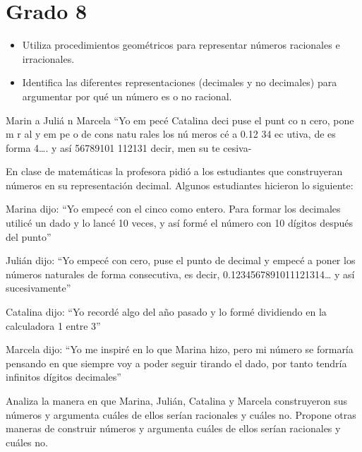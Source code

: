 \section{Grado 8}\label{grado:8}


\evidencias

\begin{itemize}
  \item Utiliza procedimientos geométricos para representar números racionales e irracionales.
  \item Identifica las diferentes representaciones (decimales y no decimales) para argumentar por qué un número es o no racional.
\end{itemize}

\ejemplo

Marin a Juliá n Marcela “Yo em pecé Catalina deci puse el punt co n cero, pone m r al y em pe o de cons natu rales los nú meros cé a 0.12 34 ec utiva, de es forma 4…. y así 56789101 112131 decir, men su te cesiva-

En clase de matemáticas la profesora pidió a los estudiantes que construyeran números en su representación decimal. Algunos estudiantes hicieron lo siguiente:

Marina dijo: “Yo empecé con el cinco como entero. Para formar los decimales utilicé un dado y lo lancé 10 veces, y así formé el número con 10 dígitos después del punto”

Julián dijo: “Yo empecé con cero, puse el punto de decimal y empecé a poner los números naturales de forma consecutiva, es decir, 0.1234567891011121314… y así sucesivamente”

Catalina dijo: “Yo recordé algo del año pasado y lo formé dividiendo en la calculadora 1 entre 3”

Marcela dijo: “Yo me inspiré en lo que Marina hizo, pero mi número se formaría pensando en que siempre voy a poder seguir tirando el dado, por tanto tendría infinitos dígitos decimales”

Analiza la manera en que Marina, Julián, Catalina y Marcela construyeron sus números y argumenta cuáles de ellos serían racionales y cuáles no. Propone otras maneras de construir números y argumenta cuáles de ellos serían racionales y cuáles no.


